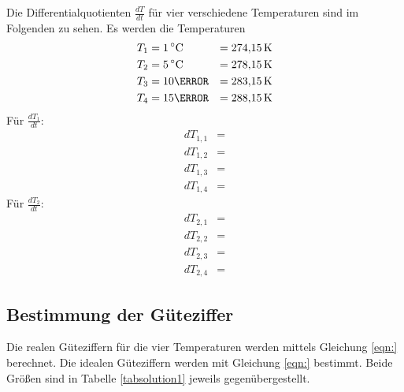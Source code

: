 Die Differentialquotienten $\frac{dT}{dt}$ für vier verschiedene Temperaturen
sind im Folgenden zu sehen. Es werden die Temperaturen
\begin{align*}
    T_1 &= \SI{1}{\degreeCelsius} &= \SI{274.15}{\kelvin} \\
    T_2 &= \SI{5}{\degreeCelsius} &= \SI{278.15}{\kelvin}\\
    T_3 &= \num{10}{\degreeCelsius} &= \SI{283.15}{\kelvin}\\
    T_4 &= \num{15}{\degreeCelsius} &= \SI{288.15}{\kelvin}
\end{align*}
Für $\frac{dT_1}{dt}$:
\begin{align*}
    dT_{1,1} &= \num{} \\
    dT_{1,2} &= \num{} \\
    dT_{1,3} &= \num{} \\
    dT_{1,4} &= \num{}
\end{align*}
Für $\frac{dT_2}{dt}$:
\begin{align*}
    dT_{2,1} &= \num{} \\
    dT_{2,2} &= \num{} \\
    dT_{2,3} &= \num{} \\
    dT_{2,4} &= \num{}
\end{align*}

\subsection{Bestimmung der Güteziffer}
Die realen Güteziffern für die vier Temperaturen werden mittels
Gleichung \eqref{eqn:} %
berechnet.
Die idealen Güteziffern werden mit Gleichung \eqref{eqn:} %
bestimmt.
Beide Größen sind in Tabelle \ref{tabsolution1} jeweils
gegenübergestellt.


